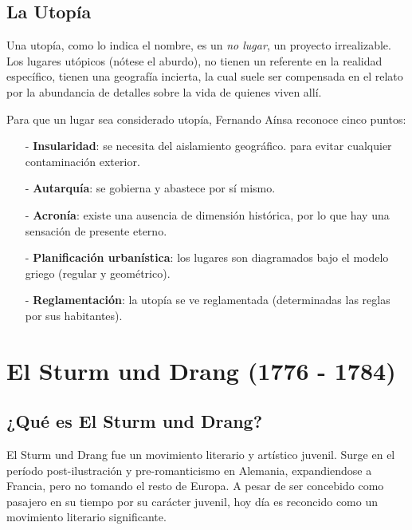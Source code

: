 \documentclass{article}
\begin{document}
\subsection{La Utopía}

Una utopía, como lo indica el nombre, es un \textit{no lugar}, un proyecto irrealizable. Los lugares utópicos (nótese el aburdo), no tienen un referente en la realidad específico, tienen una geografía incierta, la cual suele ser compensada en el relato por la abundancia de detalles sobre la vida de  quienes viven allí.

Para que un lugar sea considerado utopía, Fernando Aínsa reconoce cinco puntos:

\begin{itemize}
    \item[-] \textbf{Insularidad}: se necesita del aislamiento geográfico.
    para evitar cualquier contaminación exterior.
    \item[-] \textbf{Autarquía}: se gobierna y abastece por sí mismo.
    \item[-] \textbf{Acronía}: existe una ausencia de dimensión histórica, por lo que hay una sensación de presente eterno.
    \item[-] \textbf{Planificación urbanística}: los lugares son diagramados bajo el modelo griego (regular y geométrico).
    \item[-] \textbf{Reglamentación}: la utopía se ve reglamentada (determinadas las reglas por sus habitantes).
\end{itemize}


\section{El Sturm und Drang (1776 - 1784)}

\subsection{¿Qué es El Sturm und Drang?}

El Sturm und Drang fue un movimiento literario y artístico juvenil. Surge en el período post-ilustración y pre-romanticismo en Alemania, expandiendose a Francia, pero no tomando el resto de Europa. A pesar de ser concebido como pasajero en su tiempo por su carácter juvenil, hoy día es reconcido como un movimiento literario significante.
\end{document}
